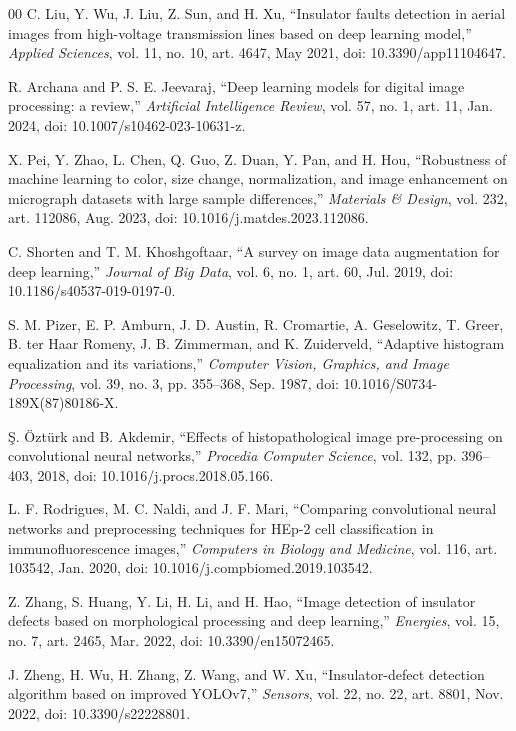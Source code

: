\documentclass[conference]{IEEEtran}
\begin{document}
\begin{thebibliography}{00}
 C. Liu, Y. Wu, J. Liu, Z. Sun, and H. Xu, ``Insulator faults detection in aerial images from high-voltage transmission lines based on deep learning model,'' \textit{Applied Sciences}, vol. 11, no. 10, art. 4647, May 2021, doi: 10.3390/app11104647.

 R. Archana and P. S. E. Jeevaraj, ``Deep learning models for digital image processing: a review,'' \textit{Artificial Intelligence Review}, vol. 57, no. 1, art. 11, Jan. 2024, doi: 10.1007/s10462-023-10631-z.

 X. Pei, Y. Zhao, L. Chen, Q. Guo, Z. Duan, Y. Pan, and H. Hou, ``Robustness of machine learning to color, size change, normalization, and image enhancement on micrograph datasets with large sample differences,'' \textit{Materials \& Design}, vol. 232, art. 112086, Aug. 2023, doi: 10.1016/j.matdes.2023.112086.

 C. Shorten and T. M. Khoshgoftaar, ``A survey on image data augmentation for deep learning,'' \textit{Journal of Big Data}, vol. 6, no. 1, art. 60, Jul. 2019, doi: 10.1186/s40537-019-0197-0.

 S. M. Pizer, E. P. Amburn, J. D. Austin, R. Cromartie, A. Geselowitz, T. Greer, B. ter Haar Romeny, J. B. Zimmerman, and K. Zuiderveld, ``Adaptive histogram equalization and its variations,'' \textit{Computer Vision, Graphics, and Image Processing}, vol. 39, no. 3, pp. 355--368, Sep. 1987, doi: 10.1016/S0734-189X(87)80186-X.

 \c{S}. \"Ozt\"urk and B. Akdemir, ``Effects of histopathological image pre-processing on convolutional neural networks,'' \textit{Procedia Computer Science}, vol. 132, pp. 396--403, 2018, doi: 10.1016/j.procs.2018.05.166.

 L. F. Rodrigues, M. C. Naldi, and J. F. Mari, ``Comparing convolutional neural networks and preprocessing techniques for HEp-2 cell classification in immunofluorescence images,'' \textit{Computers in Biology and Medicine}, vol. 116, art. 103542, Jan. 2020, doi: 10.1016/j.compbiomed.2019.103542.

 Z. Zhang, S. Huang, Y. Li, H. Li, and H. Hao, ``Image detection of insulator defects based on morphological processing and deep learning,'' \textit{Energies}, vol. 15, no. 7, art. 2465, Mar. 2022, doi: 10.3390/en15072465.

 J. Zheng, H. Wu, H. Zhang, Z. Wang, and W. Xu, ``Insulator-defect detection algorithm based on improved YOLOv7,'' \textit{Sensors}, vol. 22, no. 22, art. 8801, Nov. 2022, doi: 10.3390/s22228801.


\end{thebibliography}
\end{document}
